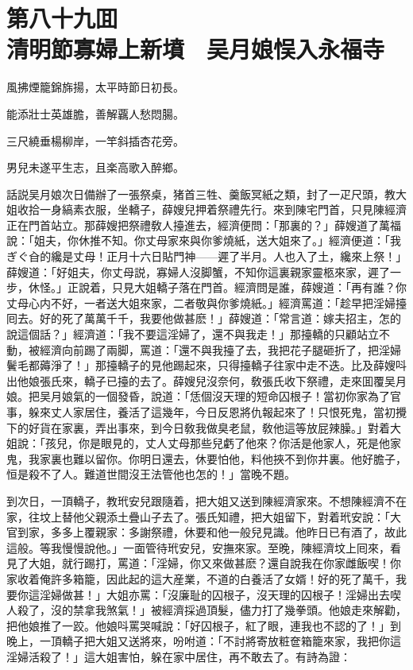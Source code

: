 
\chapter*{第八十九囬　\\清明節寡婦上新墳　吴月娘悮入永福寺}


\begin{myquote}
風拂煙籠錦旆揚，太平時節日初長。

能添壯士英雄膽，善解覊人愁悶腸。

三尺繞垂楊柳岸，一竿斜插杏花旁。

男兒未遂平生志，且楽高歌入醉鄉。
\end{myquote}

話説吴月娘次日備辦了一張祭桌，猪首三牲、羹飯冥紙之類，封了一疋尺頭，教大姐收拾一身縞素衣服，坐轎子，薛嫂兒押着祭禮先行。來到陳宅門首，只見陳經濟正在門首站立。那薛嫂把祭禮敎人擡進去，經濟便問：「那裏的？」薛嫂道了萬福說：「姐夫，你休推不知。你丈母家來與你爹燒紙，送大姐來了。」經濟便道：「我ぎぐ㒲的纔是丈母！正月十六日貼門神——遲了半月。人也入了土，纔來上祭！」薛嫂道：「好姐夫，你丈母説，寡婦人沒脚蟹，不知你這裏親家靈柩來家，遲了一步，休怪。」正說着，只見大姐轎子落在門首。經濟問是誰，薛嫂道：「再有誰？你丈母心内不好，一者送大姐來家，二者敬與你爹燒紙。」經濟罵道：「趁早把淫婦擡囘去。好的死了萬萬千千，我要他做甚麽！」薛嫂道：「常言道：嫁夫招主，怎的說這個話？」經濟道：「我不要這淫婦了，還不與我走！」那擡轎的只顧站立不動，被經濟向前踢了兩脚，罵道：「還不與我擡了去，我把花子腿砸折了，把淫婦鬢毛都薅淨了！」那擡轎子的見他踢起來，只得擡轎子往家中走不迭。比及薛嫂呌出他娘張氏來，轎子已擡的去了。薛嫂兒沒奈何，敎張氏收下祭禮，走來囬覆吴月娘。把吴月娘氣的一個發昏，說道：「恁個沒天理的短命囚根子！當初你家為了官事，躲來丈人家居住，養活了這幾年，今日反恩將仇報起來了！只恨死鬼，當初攪下的好貨在家裏，弄出事來，到今日敎我做臭老鼠，敎他這等放屁辣臊。」對着大姐說：「孩兒，你是眼見的，丈人丈母那些兒虧了他來？你活是他家人，死是他家鬼，我家裏也難以留你。你明日還去，休要怕他，料他挾不到你井裏。他好膽子，恒是殺不了人。難道世間沒王法管他也怎的！」當晚不題。

到次日，一頂轎子，教玳安兒跟隨着，把大姐又送到陳經濟家來。不想陳經濟不在家，往坟上替他父親添土疊山子去了。張氏知禮，把大姐留下，對着玳安說：「大官到家，多多上覆親家：多謝祭禮，休要和他一般兒見識。他昨日已有酒了，故此這般。等我慢慢說他。」一面管待玳安兒，安撫來家。至晚，陳經濟坟上囘來，看見了大姐，就行踢打，罵道：「淫婦，你又來做甚麽？還自說我在你家雌飯喫！你家收着俺許多箱籠，因此起的這大産業，不道的白養活了女婿！好的死了萬千，我要你這淫婦做甚！」大姐亦罵：「沒廉耻的囚根子，沒天理的囚根子！淫婦出去喫人殺了，沒的禁拿我煞氣！」被經濟採過頂髮，儘力打了幾拳頭。他娘走來解勸，把他娘推了一跤。他娘呌罵哭喊說：「好囚根子，紅了眼，連我也不認的了！」到晚上，一頂轎子把大姐又送將來，吩咐道：「不討將寄放粧奩箱籠來家，我把你這淫婦活殺了！」這大姐害怕，躲在家中居住，再不敢去了。有詩為證：

